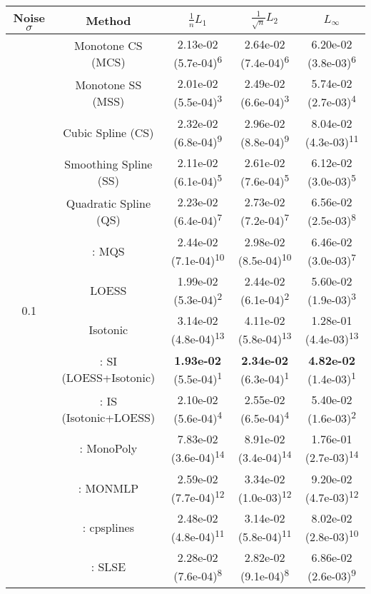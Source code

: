 \begin{tabular}{ccccc}
\toprule
Noise $\sigma$ & Method&$\frac 1n L_1$&$\frac{1}{\sqrt n}L_2$&$L_\infty$\tabularnewline
\midrule
\multirow{14}{*}{0.1}&Monotone CS (MCS)& 2.13e-02 (5.7e-04)\textsuperscript{6}& 2.64e-02 (7.4e-04)\textsuperscript{6}& 6.20e-02 (3.8e-03)\textsuperscript{6}\tabularnewline
&Monotone SS (MSS)& 2.01e-02 (5.5e-04)\textsuperscript{3}& 2.49e-02 (6.6e-04)\textsuperscript{3}& 5.74e-02 (2.7e-03)\textsuperscript{4}\tabularnewline
&Cubic Spline (CS)& 2.32e-02 (6.8e-04)\textsuperscript{9}& 2.96e-02 (8.8e-04)\textsuperscript{9}& 8.04e-02 (4.3e-03)\textsuperscript{11}\tabularnewline
&Smoothing Spline (SS)& 2.11e-02 (6.1e-04)\textsuperscript{5}& 2.61e-02 (7.6e-04)\textsuperscript{5}& 6.12e-02 (3.0e-03)\textsuperscript{5}\tabularnewline
&Quadratic Spline (QS)& 2.23e-02 (6.4e-04)\textsuperscript{7}& 2.73e-02 (7.2e-04)\textsuperscript{7}& 6.56e-02 (2.5e-03)\textsuperscript{8}\tabularnewline
&\textcite{heMonotoneBsplineSmoothing1998}: MQS& 2.44e-02 (7.1e-04)\textsuperscript{10}& 2.98e-02 (8.5e-04)\textsuperscript{10}& 6.46e-02 (3.0e-03)\textsuperscript{7}\tabularnewline
&LOESS& 1.99e-02 (5.3e-04)\textsuperscript{2}& 2.44e-02 (6.1e-04)\textsuperscript{2}& 5.60e-02 (1.9e-03)\textsuperscript{3}\tabularnewline
&Isotonic& 3.14e-02 (4.8e-04)\textsuperscript{13}& 4.11e-02 (5.8e-04)\textsuperscript{13}& 1.28e-01 (4.4e-03)\textsuperscript{13}\tabularnewline
&\textcite{mammenEstimatingSmoothMonotone1991}: SI (LOESS+Isotonic)& \textbf{1.93e-02} (5.5e-04)\textsuperscript{1}& \textbf{2.34e-02} (6.3e-04)\textsuperscript{1}& \textbf{4.82e-02} (1.4e-03)\textsuperscript{1}\tabularnewline
&\textcite{mammenEstimatingSmoothMonotone1991}: IS (Isotonic+LOESS)& 2.10e-02 (5.6e-04)\textsuperscript{4}& 2.55e-02 (6.5e-04)\textsuperscript{4}& 5.40e-02 (1.6e-03)\textsuperscript{2}\tabularnewline
&\textcite{murrayFastFlexibleMethods2016}: MonoPoly& 7.83e-02 (3.6e-04)\textsuperscript{14}& 8.91e-02 (3.4e-04)\textsuperscript{14}& 1.76e-01 (2.7e-03)\textsuperscript{14}\tabularnewline
&\textcite{cannonMonmlpMultilayerPerceptron2017}: MONMLP& 2.59e-02 (7.7e-04)\textsuperscript{12}& 3.34e-02 (1.0e-03)\textsuperscript{12}& 9.20e-02 (4.7e-03)\textsuperscript{12}\tabularnewline
&\textcite{navarro-garciaConstrainedSmoothingOutofrange2023}: cpsplines& 2.48e-02 (4.8e-04)\textsuperscript{11}& 3.14e-02 (5.8e-04)\textsuperscript{11}& 8.02e-02 (2.8e-03)\textsuperscript{10}\tabularnewline
&\textcite{groeneboomConfidenceIntervalsMonotone2023}: SLSE& 2.28e-02 (7.6e-04)\textsuperscript{8}& 2.82e-02 (9.1e-04)\textsuperscript{8}& 6.86e-02 (2.6e-03)\textsuperscript{9}\tabularnewline

\end{tabular}
